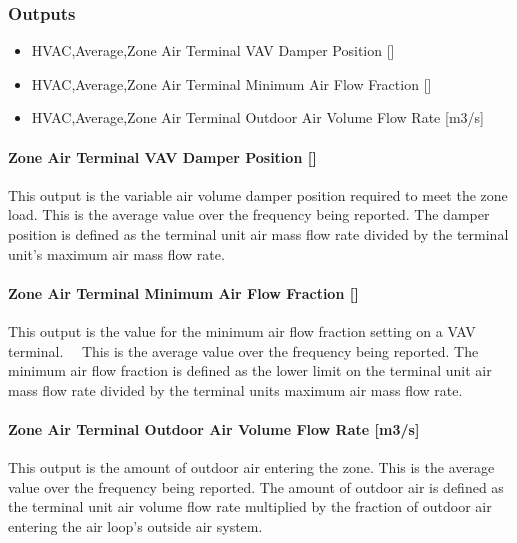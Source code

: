 \subsubsection{Outputs}\label{outputs-2-000}

\begin{itemize}
\item
  HVAC,Average,Zone Air Terminal VAV Damper Position {[]}
\item
  HVAC,Average,Zone Air Terminal Minimum Air Flow Fraction {[]}
\item
  HVAC,Average,Zone Air Terminal Outdoor Air Volume Flow Rate {[}m3/s{]}
\end{itemize}

\paragraph{Zone Air Terminal VAV Damper Position {[]}}\label{zone-air-terminal-vav-damper-position}

This output is the variable air volume damper position required to meet the zone load. This is the average value over the frequency being reported. The damper position is defined as the terminal unit air mass flow rate divided by the terminal unit's maximum air mass flow rate.

\paragraph{Zone Air Terminal Minimum Air Flow Fraction {[]}}\label{zone-air-terminal-minimum-air-flow-fraction}

This output is the value for the minimum air flow fraction setting on a VAV terminal.~~ This is the average value over the frequency being reported. The minimum air flow fraction is defined as the lower limit on the terminal unit air mass flow rate divided by the terminal units maximum air mass flow rate.

\paragraph{Zone Air Terminal Outdoor Air Volume Flow Rate {[}m3/s{]}}

This output is the amount of outdoor air entering the zone. This is the average value over the frequency being reported. The amount of outdoor air is defined as the terminal unit air volume flow rate multiplied by the fraction of outdoor air entering the air loop's outside air system.

